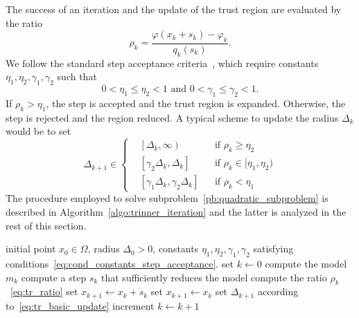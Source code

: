 \documentclass{article}
\numberwithin{equation}{section}
\newcommand{\proj}[2]{P_{#1} \left[ {#2} \right]} %
\theoremstyle{plain}
\begin{document}
	The success of an iteration and the update of the trust region are evaluated by the ratio
	\begin{equation}\label{eq:tr_ratio}
		\rho_k = \dfrac{\varphi(x_k+s_k)-\varphi_k}{q_k(s_k)}.
	\end{equation}
	We follow the standard step acceptance criteria~\cite{conn-etal:2000}, which require constants $\eta_1, \eta_2, \gamma_1, \gamma_2$ such that 
	\begin{equation}\label{eq:cond_constants_step_acceptance}
		0< \eta_1 \le \eta_2 < 1 \text{ and } 0< \gamma_1 \le \gamma_2 < 1.
	\end{equation}
	If $\rho_k  > \eta_1$, the step is accepted and the trust region is expanded. Otherwise, the step is rejected and the region reduced. A typical scheme to update the radius $\Delta_k$ would be to set
	\begin{equation}\label{eq:tr_basic_update}
		\Delta_{k+1} \in \left\{\begin{aligned}
			& \left[\Delta_k,\infty\right) & &\text{if } \rho_k \ge \eta_2 \\
			& \left[\gamma_2\Delta_k, \Delta_k\right]  & &\text{if } \rho_k \in [\eta_1,\eta_2) \\
			& \left[\gamma_1\Delta_k, \gamma_2\Delta_k\right]  & &\text{if }  \rho_k<\eta_1
		\end{aligned}\right.
	\end{equation}
	The procedure employed to solve subproblem~\eqref{pb:quadratic_subproblem} is described in Algorithm~\ref{algo:trinner_iteration} and the latter is analyzed in the rest of this section. 
	\begin{algorithm}
		\caption{Trust region inner iteration algorithm}
		\label{algo:trinner_iteration}
		\begin{algorithmic}[1]
			\Require initial point $x_0 \in \Omega$, radius $\Delta_0 >0$, constants $\eta_1, \eta_2, \gamma_1, \gamma_2$ satisfying conditions~\eqref{eq:cond_constants_step_acceptance}.
			\State set $k \gets 0$ 
			\Repeat{}
			\State compute the model $m_k$
			\State compute a step $s_k$ that sufficiently reduces the model
			\State compute the ratio $\rho_k$~\eqref{eq:tr_ratio}
			 set $x_{k+1}\gets x_k+s_k$ \Else{} set $x_{k+1} \gets x_k$ \EndIf
			\State set $\Delta_{k+1}$ according to~\eqref{eq:tr_basic_update}
			\State increment $k\gets k+1$
			\Until{$\|\proj{T_k}{g_k}\| \le \omega$}
		\end{algorithmic}
	\end{algorithm}
	
\end{document}
